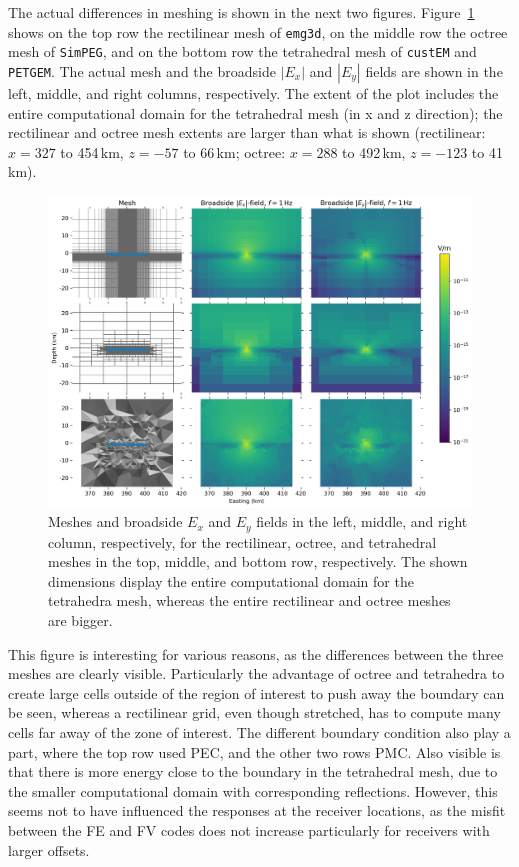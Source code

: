 \documentclass[extra, camera,%
]{gji}
\newlength{\fwidth}
\newcommand{\emg}[2]{\texttt{emg#1#2}\xspace}
\newcommand{\simpeg}{\texttt{SimPEG}\xspace}
\newcommand{\custem}{\texttt{custEM}\xspace}
\newcommand{\petgem}{\texttt{PETGEM}\xspace}
\begin{document}
The actual differences in meshing is shown in the next two figures. Figure~\ref{fig:results-marlim_big} shows on the top row the rectilinear mesh of \emg3d, on the middle row the octree mesh of \simpeg, and on the bottom row the tetrahedral mesh of \custem and \petgem. The actual mesh and the broadside $|E_x|$ and $|E_y|$ fields are shown in the left, middle, and right columns, respectively. The extent of the plot includes the entire computational domain for the tetrahedral mesh (in x and z direction); the rectilinear and octree mesh extents are larger than what is shown (rectilinear: $x=327$ to 454\,km, $z=-57$ to 66\,km; octree: $x=288$ to 492\,km, $z=-123$ to 41\,km).
%
\begin{figure}
  \centering
  \includegraphics[width=.9\fwidth]{figures/results-marlim_big.png}
  \caption{Meshes and broadside $E_x$ and $E_y$ fields in the left, middle, and right column, respectively, for the rectilinear, octree, and tetrahedral meshes in the top, middle, and bottom row, respectively. The shown dimensions display the entire computational domain for the tetrahedra mesh, whereas the entire rectilinear and octree meshes are bigger.}
  \label{fig:results-marlim_big}
\end{figure}
%
This figure is interesting for various reasons, as the differences between the three meshes are clearly visible. Particularly the advantage of octree and tetrahedra to create large cells outside of the region of interest to push away the boundary can be seen, whereas a rectilinear grid, even though stretched, has to compute many cells far away of the zone of interest. The different boundary condition also play a part, where the top row used PEC, and the other two rows PMC. Also visible is that there is more energy close to the boundary in the tetrahedral mesh, due to the smaller computational domain with corresponding reflections. However, this seems not to have influenced the responses at the receiver locations, as the misfit between the FE and FV codes does not increase particularly for receivers with larger offsets.
\end{document}
